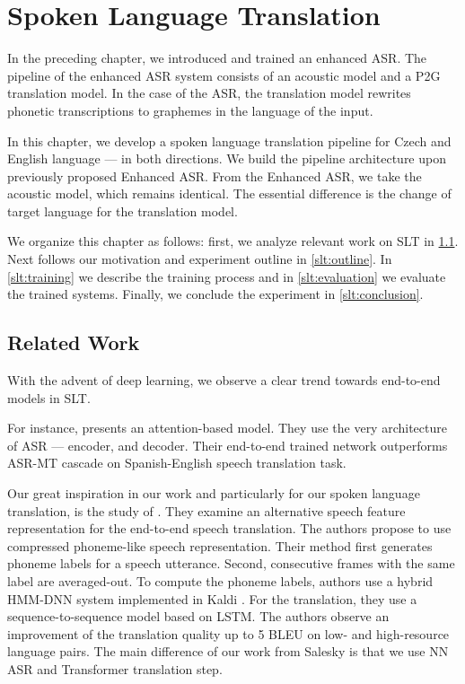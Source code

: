 \chapter{Spoken Language Translation}
\label{chap:slt}
In the preceding chapter, we introduced and trained an enhanced ASR. The pipeline of the enhanced ASR system consists of an acoustic model and a P2G translation model. In the case of the ASR, the translation model rewrites phonetic transcriptions to graphemes in the language of the input. 

In this chapter, we develop a spoken language translation pipeline for Czech and English language --- in both directions. We build the pipeline architecture upon previously proposed Enhanced ASR. From the Enhanced ASR, we take the acoustic model, which remains identical. The essential difference is the change of target language for the translation model. 

We organize this chapter as follows: first, we analyze relevant work on SLT in \cref{slt:related}. Next follows our motivation and experiment outline in \cref{slt:outline}. In \cref{slt:training} we describe the training process and in \cref{slt:evaluation} we evaluate the trained systems. Finally, we conclude the experiment in \cref{slt:conclusion}.

\section{Related Work}
\label{slt:related}

With the advent of deep learning, we observe a clear trend towards end-to-end models in SLT.

For instance,  presents an attention-based model. They use the very architecture of ASR --- encoder, and decoder. Their end-to-end trained network outperforms ASR-MT cascade on Spanish-English speech translation task.

Our great inspiration in our work and particularly for our spoken language translation, is the study of . They examine an alternative speech feature representation for the end-to-end speech translation. The authors propose to use compressed phoneme-like speech representation. Their method first generates phoneme labels for a speech utterance. Second, consecutive frames with the same label are averaged-out. To compute the phoneme labels, authors use a hybrid HMM-DNN system implemented in Kaldi . For the translation, they use a sequence-to-sequence model based on LSTM. The authors observe an improvement of the translation quality up to 5 BLEU on low- and high-resource language pairs. The main difference of our work from Salesky is that we use NN ASR and Transformer translation step.



